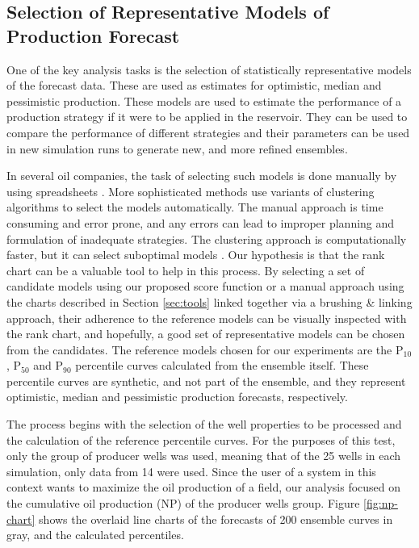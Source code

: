 \documentclass[final,5p,times,twocolumn]{elsarticle}
\begin{document}
\subsection{Selection of Representative Models of Production Forecast}
\label{sec:percentile}
One of the key analysis tasks is the selection of statistically representative models of the forecast data. These are used as estimates for optimistic, median and pessimistic production. These models are used to estimate the performance of a production strategy if it were to be applied in the reservoir. They can be used to compare the performance of different strategies and their parameters can be used in new simulation runs to generate new, and more refined ensembles.

In several oil companies, the task of selecting such models is done manually by using spreadsheets \cite{selection-sarma:2013}. More sophisticated methods use variants of clustering algorithms to select the models automatically. The manual approach is time consuming and error prone, and any errors can lead to improper planning and formulation of inadequate strategies. The clustering approach is computationally faster, but it can select suboptimal models \cite{selection-sarma:2013}. Our hypothesis is that the rank chart can be a valuable tool to help in this process. By selecting a set of candidate models using our proposed score function or a manual approach using the charts described in Section \ref{sec:tools} linked together via a brushing \& linking approach, their adherence to the reference models can be visually inspected with the rank chart, and hopefully, a good set of representative models can be chosen from the candidates. The reference models chosen for our experiments are the P$_{10}$, P$_{50}$ and P$_{90}$ percentile curves calculated from the ensemble itself. These percentile curves are synthetic, and not part of the ensemble, and they represent optimistic, median and pessimistic production forecasts, respectively.

The process begins with the selection of the well properties to be processed and the calculation of the reference percentile curves. For the purposes of this test, only the group of producer wells was used, meaning that of the 25 wells in each simulation, only data from 14 were used. Since the user of a system in this context wants to maximize the oil production of a field, our analysis focused on the cumulative oil production (NP) of the producer wells group. Figure \ref{fig:np-chart} shows the overlaid line charts of the forecasts of 200 ensemble curves in gray, and the calculated percentiles.
\end{document}
